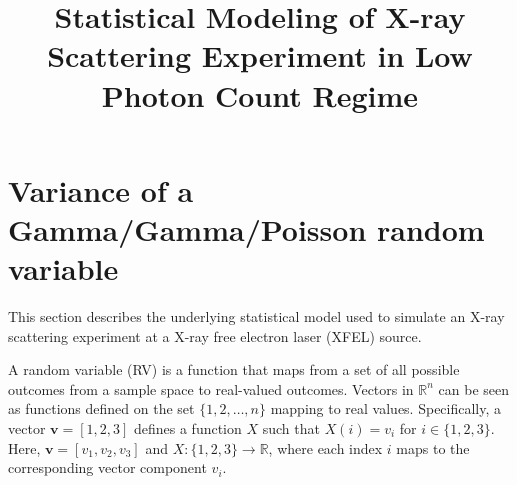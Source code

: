 \documentclass[11pt]{article}
\theoremstyle{definition}
\begin{document}


\title{\LARGE {\textbf{Statistical Modeling of X-ray Scattering Experiment in Low Photon Count Regime}}}
\maketitle
\newpage
\section{Variance of a Gamma/Gamma/Poisson random variable}
This section describes the underlying statistical model used to simulate an X-ray scattering experiment at a X-ray free electron laser (XFEL) source. 

A random variable (RV) is a function that maps from a set of all possible outcomes from a sample space to real-valued outcomes. Vectors in \(\mathbb{R}^n\) can be seen as functions defined on the set \(\{1, 2, \ldots, n\}\) mapping to real values. Specifically, a vector \(\mathbf{v} = [1, 2, 3]\) defines a function \(X\) such that \(X(i) = v_i\) for \(i \in \{1, 2, 3\}\). Here, \(\mathbf{v} = [v_1, v_2, v_3]\) and \(X: \{1, 2, 3\} \rightarrow \mathbb{R}\), where each index \(i\) maps to the corresponding vector component \(v_i\).
\end{document}
